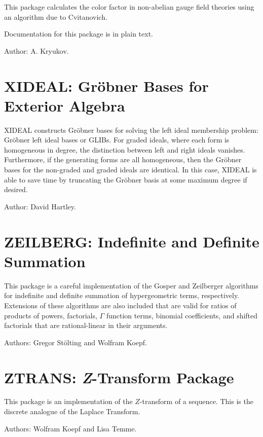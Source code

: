 
This package calculates the color factor in non-abelian gauge field
theories using an algorithm due to Cvitanovich.

Documentation for this package is in plain text.

Author: A. Kryukov.



\newpage

\section{XIDEAL: Gr\"obner Bases for Exterior Algebra}
\label{package:XIDEAL}

XIDEAL constructs Gr\"obner bases for solving the left ideal membership
problem: Gr\"obner left ideal bases or GLIBs. For graded ideals, where each
form is homogeneous in degree, the distinction between left and right
ideals vanishes. Furthermore, if the generating forms are all homogeneous,
then the Gr\"obner bases for the non-graded and graded ideals are
identical. In this case, XIDEAL is able to save time by truncating the
Gr\"obner basis at some maximum degree if desired.

Author: David Hartley.



\newpage

\section{ZEILBERG: Indefinite and Definite Summation}


This package is a careful implementation of the Gosper and Zeilberger
algorithms for indefinite and definite summation of hypergeometric terms,
respectively.  Extensions of these algorithms are also included that are
valid for ratios of products of powers, factorials, $\Gamma$ function
terms, binomial coefficients, and shifted factorials that are
rational-linear in their arguments.

Authors: Gregor St\"olting and Wolfram Koepf.



\newpage

\section{ZTRANS: \textit{Z}-Transform Package}


This package is an implementation of the $Z$-transform of a sequence.
This is the discrete analogue of the Laplace Transform.

Authors: Wolfram Koepf and Lisa Temme.



\let\sectionmark=\origsectionmark
